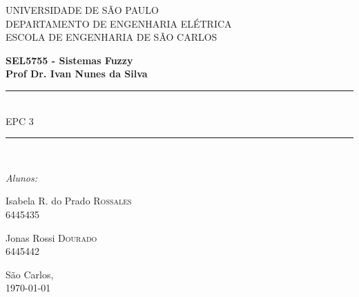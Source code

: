\documentclass{report}
\begin{document}
\newcommand{\HRule}{\rule{\linewidth}{0.5mm}}
\newcommand{\tsize}[1]{(\frac{W}{L})_{#1}}
 

\begin{titlepage}

\begin{center}


{\LARGE UNIVERSIDADE DE SÃO PAULO\\}
{\LARGE DEPARTAMENTO DE ENGENHARIA ELÉTRICA \\}
{\LARGE ESCOLA DE ENGENHARIA DE SÃO CARLOS\\[4cm]}

\textbf{\large SEL5755 - Sistemas Fuzzy}\\[1cm]
\textbf{\large Prof Dr. Ivan Nunes da Silva}\\[2cm]


\HRule \\[0.6cm]
{ \huge EPC 3\bfseries }\\[0.6cm]

\HRule \\[2cm]


\begin{center} \large
\emph{Alunos:}\\
\end{center}

\begin{minipage}{0.4\textwidth}
\begin{flushleft} \large
Isabela R. do Prado \textsc{Rossales}\\
6445435
\end{flushleft}
\end{minipage}
\begin{minipage}{0.4\textwidth}
\begin{flushright} \large
Jonas Rossi \textsc{Dourado}\\
6445442
\end{flushright}
\end{minipage}

\vfill

{\large São Carlos,\\ \today}

\end{center}

\end{titlepage}
\end{document}
